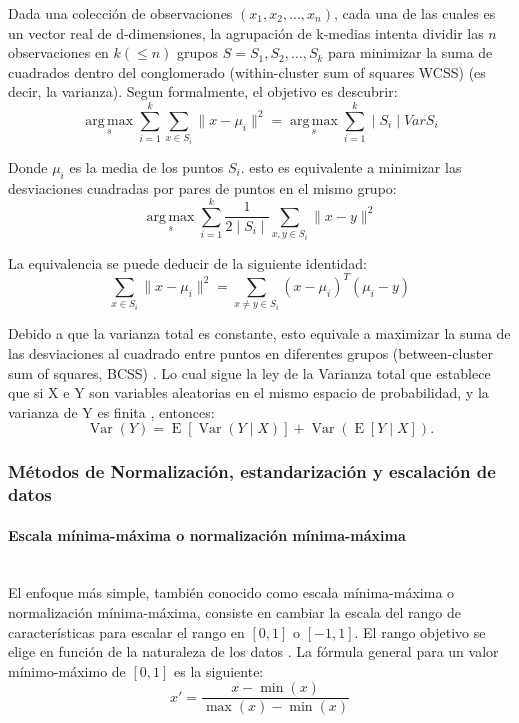 \documentclass[12pt]{article}
\newcommand{\subsubsubsection}[1]{\paragraph{#1}\mbox{}\\}
\begin{document}
				Dada una colección de observaciones $(x_1, x_2, ..., x_n)$, cada una de las cuales es un vector real de d-dimensiones, la agrupación de k-medias intenta dividir las $n$ observaciones en $k (\leq n)$ grupos $S = S_1, S_2, ..., S_k$ para minimizar la suma de cuadrados dentro del conglomerado (within-cluster sum of squares WCSS) (es decir, la varianza). Segun \cite{Mohamad2013} formalmente, el objetivo es descubrir:
				\begin{equation}\label{eq:WCSS_k_means}
				\operatorname*{arg\,max}_{s} \sum_{i=1}^{k} \sum_{x \in S_i} \parallel x - \mu_i \parallel^2 = \operatorname*{arg\,max}_{s} \sum_{i=1}^{k} \mid S_i \mid Var S_i
				\end{equation}
				
				Donde $\mu_i$ es la media de los puntos $S_i$. esto es equivalente a minimizar las desviaciones cuadradas por pares de puntos en el mismo grupo:				
				\begin{equation}\label{eq:pairwise_squared_deviations_of_points}
				\operatorname*{arg\,max}_{s} \sum_{i=1}^{k} \frac{1}{2 \mid S_i \mid}\sum_{x,y \in S_i} \parallel x - y \parallel^2
				\end{equation}
				
				La equivalencia se puede deducir de la siguiente identidad:								
				\begin{equation}\label{eq:variance_identity}
				\sum_{x \in S_i} \parallel x - \mu_i \parallel^2 = \sum_{x \neq y \in S_i}(x- \mu_i)^T(\mu_i - y)
				\end{equation}
				
				Debido a que la varianza total es constante, esto equivale a maximizar la suma de las desviaciones al cuadrado entre puntos en diferentes grupos (between-cluster sum of squares, BCSS) \cite{Kriegel2016}. Lo cual sigue la ley de la Varianza total que establece que si X e Y son variables aleatorias en el mismo espacio de probabilidad, y la varianza de Y es finita \cite{Weiss2006}, entonces:
				\begin{equation}\label{eq:law_of_Total_Variance}
				{\displaystyle \operatorname {Var} (Y)=\operatorname {E} [\operatorname {Var} (Y\mid X)]+\operatorname {Var} (\operatorname {E} [Y\mid X]).}
				\end{equation}
				
			\subsubsection{Métodos de Normalización, estandarización y escalación de datos}
			\subsubsubsection{Escala mínima-máxima o normalización mínima-máxima}
			El enfoque más simple, también conocido como escala mínima-máxima o normalización mínima-máxima, consiste en cambiar la escala del rango de características para escalar el rango en $[0, 1]$ o $[-1, 1]$. El rango objetivo se elige en función de la naturaleza de los datos \cite{Ekaterina2019}. La fórmula general para un valor mínimo-máximo de $[0, 1]$ es la siguiente:
			\begin{equation}\label{eq:Min_Max_scaler}
			x'=\frac  {x - \min(x)}{\max(x)-\min(x)}
			\end{equation}
			
\end{document}
